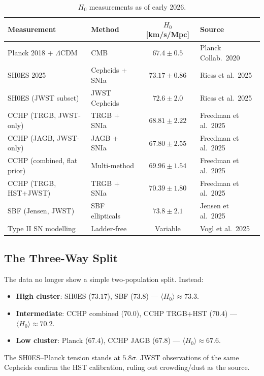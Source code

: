 \documentclass[11pt,a4paper]{article}
\newcommand{\Hzero}{H_0}
\newcommand{\LCDM}{$\Lambda$CDM}
\begin{document}
\begin{table}[H]
\centering
\caption{$\Hzero$ measurements as of early 2026.}
\label{tab:H0-values}
\begin{tabular}{llcl}
\toprule
\textbf{Measurement} & \textbf{Method} & $\Hzero$ [km/s/Mpc] & \textbf{Source} \\
\midrule
Planck 2018 + \LCDM & CMB & $67.4 \pm 0.5$ & Planck Collab.\ 2020 \\
SH0ES 2025 & Cepheids + SNIa & $73.17 \pm 0.86$ & Riess et al.\ 2025 \\
SH0ES (JWST subset) & JWST Cepheids & $72.6 \pm 2.0$ & Riess et al.\ 2025 \\
CCHP (TRGB, JWST-only) & TRGB + SNIa & $68.81 \pm 2.22$ & Freedman et al.\ 2025 \\
CCHP (JAGB, JWST-only) & JAGB + SNIa & $67.80 \pm 2.55$ & Freedman et al.\ 2025 \\
CCHP (combined, flat prior) & Multi-method & $69.96 \pm 1.54$ & Freedman et al.\ 2025 \\
CCHP (TRGB, HST+JWST) & TRGB + SNIa & $70.39 \pm 1.80$ & Freedman et al.\ 2025 \\
SBF (Jensen, JWST) & SBF ellipticals & $73.8 \pm 2.1$ & Jensen et al.\ 2025 \\
Type II SN modelling & Ladder-free & Variable & Vogl et al.\ 2025 \\
\bottomrule
\end{tabular}
\end{table}

\subsection{The Three-Way Split}

The data no longer show a simple two-population split. Instead:
\begin{itemize}[nosep]
\item \textbf{High cluster}: SH0ES ($73.17$), SBF ($73.8$) ---
  $\langle\Hzero\rangle \approx 73.3$.
\item \textbf{Intermediate}: CCHP combined ($70.0$), CCHP TRGB+HST ($70.4$)
  --- $\langle\Hzero\rangle \approx 70.2$.
\item \textbf{Low cluster}: Planck ($67.4$), CCHP JAGB ($67.8$) ---
  $\langle\Hzero\rangle \approx 67.6$.
\end{itemize}

The SH0ES--Planck tension stands at $5.8\sigma$. JWST observations
of the same Cepheids confirm the HST calibration, ruling out
crowding/dust as the source.
\end{document}
